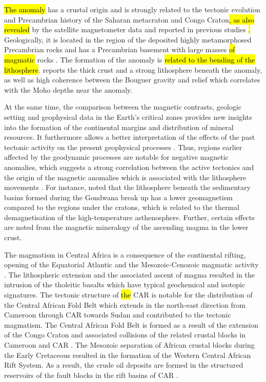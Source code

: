 \documentclass[minerals,article,submit,pdftex,moreauthors]{Definitions/mdpi}
\begin{document}
\hl{The anomaly} has a crustal origin and is strongly related to the tectonic evolution and Precambrian history of the Saharan metacraton and Congo Craton\hl{, as also revealed} by the satellite magnetometer data and reported in previous studies \cite{Regan,OUABEGO201311,NJITEUTCHOUKEU2021104206}\hl{. }Geologically, it is located in the region of the deposited highly metamorphosed Precambrian rocks and has a Precambrian basement with large masses \hl{of magmatic} rocks \cite{Kochemasov}. The formation of the anomaly is \hl{related to the bending of the lithosphere}. \cite{NJITEUTCHOUKEU2021104299} reports the thick crust and a strong lithosphere beneath the anomaly, as well as high coherence between the Bouguer gravity and relief which correlates with the Moho depths near the anomaly.

At the same time, the comparison between the magnetic contrasts, geologic setting and geophysical data in the Earth's critical zones provides new insights into the formation of the continental margins and distribution of mineral resources. It furthermore allows a better interpretation of the effects of the past tectonic activity on the present geophysical processes \cite{FELIXTOTEU2002906}. Thus, regions earlier affected by the geodynamic processes are notable for negative magnetic anomalies, which suggests a strong correlation between the active tectonics and the origin of the magnetic anomalies which is associated with the lithosphere movements \cite{RAVAT199259}. For instance, \cite{ARKANIHAMED1985257} noted that the lithosphere beneath the sedimentary basins formed during the Gondwana break up has a lower geomagnetism compared to the regions under the cratons, which is related to the thermal demagnetisation of the high-temperature asthenosphere. Further, certain effects are noted from the magnetic mineralogy of the ascending magma in the lower crust.

The magmatism in Central Africa is a consequence of the continental rifting, opening of the Equatorial Atlantic and the Mesozoic-Cenozoic magmatic activity \cite{WILSON1992203}. The lithospheric extension and the associated ascent of magma resulted in the intrusion of the tholeitic basalts which have typical geochemical and isotopic signatures. The tectonic structure of \hl{the} CAR is notable for the distribution of the Central African Fold Belt which extends in the north-east direction from Cameroon through CAR towards Sudan and contributed to the tectonic magmatism. The Central African Fold Belt is formed as a result of the extension of the Congo Craton and associated collisions of the related crustal blocks in Cameroon and CAR \cite{TOTEU2022296}. The Mesozoic separation of African crustal blocks during the Early Cretaceous resulted in the formation of the Western Central African Rift System. As a result, the crude oil deposits are formed in the structured reservoirs of the fault blocks in the rift basins of CAR \cite{GENIK1992169}.
\end{document}
